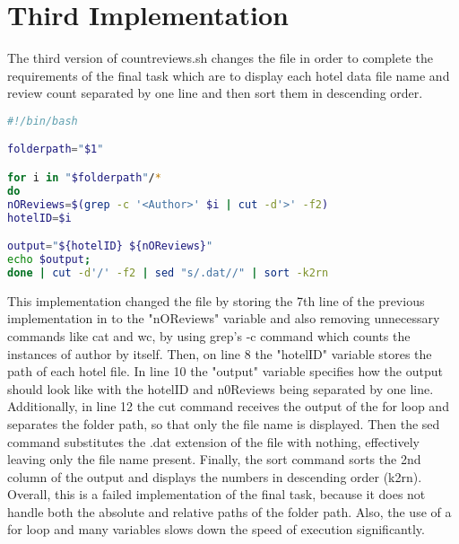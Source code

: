 \documentclass{report}
\begin{document}
\section{Third Implementation}
The third version of countreviews.sh changes the file in order to complete the requirements of the final task which are to display each hotel data file name and review count separated by one line and then sort them in descending order. 
\begin{lstlisting}[language=bash]
#!/bin/bash

folderpath="$1"

for i in "$folderpath"/*
do
nOReviews=$(grep -c '<Author>' $i | cut -d'>' -f2)
hotelID=$i

output="${hotelID} ${nOReviews}"
echo $output;
done | cut -d'/' -f2 | sed "s/.dat//" | sort -k2rn
\end{lstlisting}
This implementation changed the file by storing the 7th line of the previous implementation in to the "nOReviews" variable and also removing unnecessary commands like cat and wc, by using grep's -c command which counts the instances of author by itself. Then, on line 8 the "hotelID" variable stores the path of each hotel file. In line 10 the "output" variable specifies how the output should look like with the hotelID and n0Reviews being separated by one line. Additionally, in line 12 the cut command receives the output of the for loop and separates the folder path, so that only the file name is displayed. Then the sed command substitutes the .dat extension of the file with nothing, effectively leaving only the file name present. Finally, the sort command sorts the 2nd column of the output and displays the numbers in descending order (k2rn). Overall, this is a failed implementation of the final task, because it does not handle both the absolute and relative paths of the folder path. Also, the use of a for loop and many variables slows down the speed of execution significantly.
\end{document}

